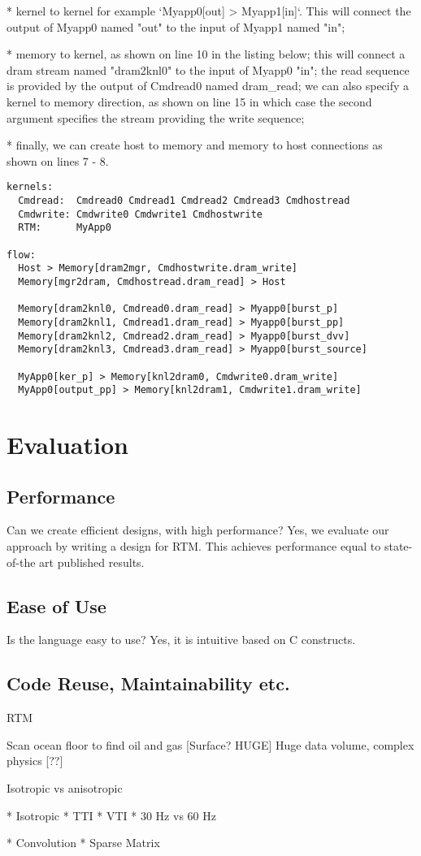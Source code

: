 * kernel to kernel for example `Myapp0[out] > Myapp1[in]`. This will
  connect the output of Myapp0 named "out" to the input of Myapp1
  named "in";

* memory to kernel, as shown on line 10 in the listing below; this
  will connect a dram stream named "dram2knl0" to the input of Myapp0
  "in"; the read sequence is provided by the output of Cmdread0 named
  dram\_read; we can also specify a kernel to memory direction, as
  shown on line 15 in which case the second argument specifies the
  stream providing the write sequence;

* finally, we can create host to memory and memory to host connections
  as shown on lines 7 - 8.

\lstset{style=MaxCconf}

\begin{lstlisting}
kernels:
  Cmdread:  Cmdread0 Cmdread1 Cmdread2 Cmdread3 Cmdhostread
  Cmdwrite: Cmdwrite0 Cmdwrite1 Cmdhostwrite
  RTM:      MyApp0

flow:
  Host > Memory[dram2mgr, Cmdhostwrite.dram_write]
  Memory[mgr2dram, Cmdhostread.dram_read] > Host

  Memory[dram2knl0, Cmdread0.dram_read] > Myapp0[burst_p]
  Memory[dram2knl1, Cmdread1.dram_read] > Myapp0[burst_pp]
  Memory[dram2knl2, Cmdread2.dram_read] > Myapp0[burst_dvv]
  Memory[dram2knl3, Cmdread3.dram_read] > Myapp0[burst_source]

  MyApp0[ker_p] > Memory[knl2dram0, Cmdwrite0.dram_write]
  MyApp0[output_pp] > Memory[knl2dram1, Cmdwrite1.dram_write]
\end{lstlisting}


\section{Evaluation}

\subsection{Performance}

Can we create efficient designs, with high performance?  Yes, we
evaluate our approach by writing a design for RTM. This achieves
performance equal to state-of-the art published results.

\subsection{Ease of Use}

Is the language easy to use?
Yes, it is intuitive based on C constructs.

\subsection{Code Reuse, Maintainability etc.}



RTM

Scan ocean floor to find oil and gas [Surface? HUGE]
Huge data volume, complex physics [??]

Isotropic vs anisotropic

* Isotropic
* TTI
* VTI
* 30 Hz vs 60 Hz

* Convolution
* Sparse Matrix
